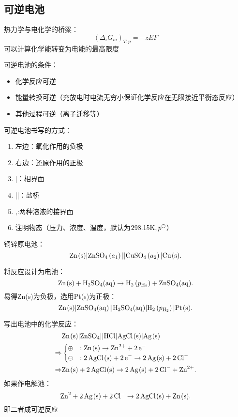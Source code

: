 \subsection{可逆电池}%
\label{sub:可逆电池}
热力学与电化学的桥梁：\begin{equation}
    \label{eq:drgmtpzef}
    \left( \Delta_\text{r}G_{m} \right)_{T,p} = -zEF
\end{equation}
可以计算化学能转变为电能的最高限度
\begin{notation}
    可逆电池的条件：
    \begin{itemize}
        \item 化学反应可逆
        \item 能量转换可逆（充放电时电流无穷小保证化学反应在无限接近平衡态反应）
        \item 其他过程可逆（离子迁移等）
    \end{itemize}
\end{notation}
可逆电池书写的方式：
\begin{enumerate}
    \item 左边：氧化作用的负极
    \item 右边：还原作用的正极
    \item |：相界面
    \item ||：盐桥
    \item ,:两种溶液的接界面
    \item 注明物态（压力、浓度、温度，默认为$298.15\ce{K}, p^\ominus$）
\end{enumerate}
\begin{eg}
    铜锌原电池：\[
        \ce{Zn(s)} | \ce{ZnSO_4}\left( a_1 \right)\text{||}\ce{CuSO_4}\left( a_2 \right) | \ce{Cu(s)}
    .\]
\end{eg}
\begin{eg}
    将反应设计为电池：\[
        \ce{Zn(s)}+\ce{H_2SO_4(aq)}\to \ce{H_2}\left( p_{\ce{H_2}} \right) + \ce{ZnSO_4(aq)}
    .\]
    易得Zn(s)为负极，选用Pt(s)为正极：
    \[
        \ce{Zn(s)} | \ce{ZnSO_4(aq)} \text{||}\ce{H_2SO_4(aq)} | \ce{H_2}\left( p_{\ce{H_2}} \right) | \ce{Pt(s)}
    .\]
\end{eg}
\begin{eg}
    写出电池中的化学反应：
    \begin{align*}
        &\ce{Zn(s)} | \ce{ZnSO_4}\text{||}\ce{HCl}|\ce{AgCl(s)}|\ce{Ag(s)}\\
        \Rightarrow &\begin{cases}
            \oplus&: \ce{Zn(s)}\to \ce{Zn^2+}+\ce{2e-}\\
            \ominus&: \ce{2AgCl(s)}+\ce{2e-}\to \ce{2Ag(s)}+\ce{2Cl-}
        \end{cases}\\
            \Rightarrow &\ce{Zn(s)}+\ce{2AgCl(s)}\to \ce{2Ag(s)}+\ce{2Cl-}+\ce{Zn^2+}
    .\end{align*}
    如果作电解池：\[
        \ce{Zn^2}+\ce{2Ag(s)} + \ce{2Cl-} \to \ce{2AgCl(s)}+\ce{Zn(s)}
    .\]
    即二者成可逆反应
\end{eg}
